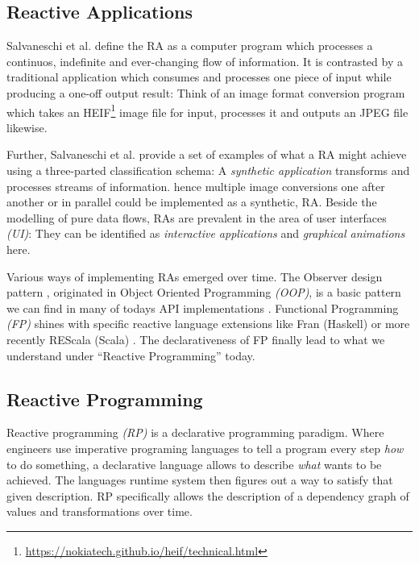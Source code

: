 \documentclass[12pt,a4paper]{article}
\begin{document}
\subsection{Reactive Applications}

Salvaneschi et al. \cite{7827078} define the RA as a computer program which processes a continuos, indefinite and ever-changing flow of information. It is contrasted by a traditional application which consumes and processes one piece of input while producing a one-off output result: Think of an image format conversion program which takes an HEIF\footnote{\url{https://nokiatech.github.io/heif/technical.html}} image file for input, processes it and outputs an JPEG file likewise.

Further, Salvaneschi et al. provide a set of examples of what a RA might achieve using a three-parted classification schema: A \emph{synthetic application} transforms and processes streams of information. hence multiple image conversions one after another or in parallel could be implemented as a synthetic, RA. Beside the modelling of pure data flows, RAs are prevalent in the area of user interfaces \emph{(UI)}: They can be identified as \emph{interactive applications} and \emph{graphical animations} here.

Various ways of implementing RAs emerged over time. The Observer design pattern \cite{gamma1995design}, originated in Object Oriented Programming \emph{(OOP)}, is a basic pattern we can find in many of todays API implementations \cite{alabor:2019:reactiveappllications}. Functional Programming \emph{(FP)} shines with specific reactive language extensions like Fran (Haskell) \cite{10.1145/2501654.2501666} or more recently REScala (Scala) \cite{10.1145/2577080.2577083}. The declarativeness of FP finally lead to what we understand under ``Reactive Programming'' today.

\subsection{Reactive Programming}

Reactive programming \emph{(RP)} is a declarative programming paradigm. Where engineers use imperative programing languages to tell a program every step \emph{how} to do something, a declarative language allows to describe \emph{what} wants to be achieved. The languages runtime system then figures out a way to satisfy that given description. RP specifically allows the description of a dependency graph of values and transformations over time.
\end{document}
